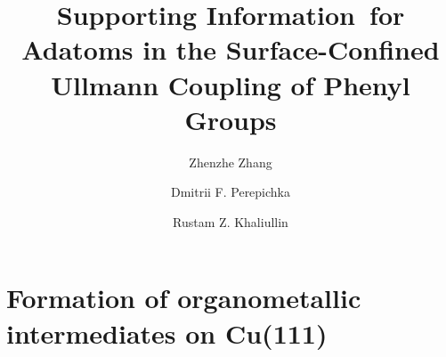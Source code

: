 \documentclass[aps,prl,reprint,amsmath,amssymb,floatfix,notitlepage]{revtex4-1}
\newcommand{\sinfo}{Supporting Information}
\begin{document}
\title{\sinfo\ for \\
Adatoms in the Surface-Confined Ullmann Coupling of Phenyl Groups}%

\author{Zhenzhe Zhang}
\author{Dmitrii F. Perepichka}%
\author{Rustam Z. Khaliullin}
%


\maketitle

%



\section{Formation of organometallic intermediates on Cu(111)} 
\end{document}
